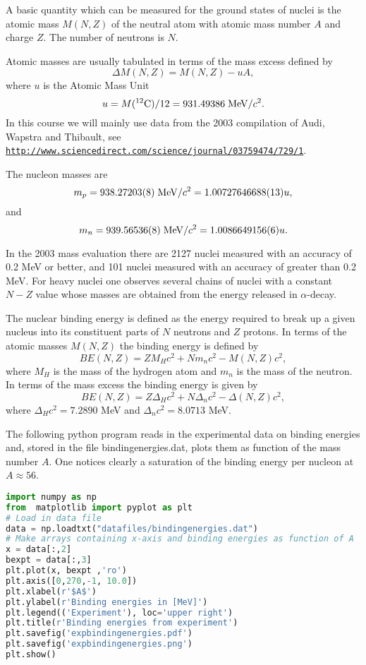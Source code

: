 \documentclass[graybox,sectrefs,envcountresetchap,open=right]{svmonodo}
\begin{document}
A basic quantity which can be measured for the ground states of nuclei is the atomic mass $M(N, Z)$ of the neutral atom with atomic mass number $A$ and charge $Z$. The number of neutrons is $N$.

Atomic masses are usually tabulated in terms of the mass excess defined by
\[
\Delta M(N, Z) =  M(N, Z) - uA,
\]
where $u$ is the Atomic Mass Unit 
\[
u = M(^{12}\mathrm{C})/12 = 931.49386 \hspace{0.1cm} \mathrm{MeV}/c^2.
\]
In this course we will mainly use 
data from the 2003 compilation of Audi, Wapstra and Thibault, see \href{{http://www.sciencedirect.com/science/journal/03759474/729/1}}{\nolinkurl{http://www.sciencedirect.com/science/journal/03759474/729/1}}.


The nucleon masses are
\[
m_p = 938.27203(8)\hspace{0.1cm} \mathrm{MeV}/c^2 = 1.00727646688(13)u,
\] 
and
\[
m_n = 939.56536(8)\hspace{0.1cm} \mathrm{MeV}/c^2 = 1.0086649156(6)u.
\]

In the 2003 mass evaluation there are 2127 nuclei measured with an accuracy of 0.2
MeV or better, and 101 nuclei measured with an accuracy of greater than 0.2 MeV. For
heavy nuclei one observes several chains of nuclei with a constant $N-Z$ value whose masses are obtained from the energy released in $\alpha$-decay.


The nuclear binding energy is defined as the energy required to break up a given nucleus
into its constituent parts of $N$ neutrons and $Z$ protons. In terms of the atomic masses $M(N, Z)$ the binding energy is defined by
\[
BE(N, Z) = ZM_H c^2 + Nm_n c^2 - M(N, Z)c^2 ,
\]
where $M_H$ is the mass of the hydrogen atom and $m_n$ is the mass of the neutron.
In terms of the mass excess the binding energy is given by
\[
BE(N, Z) = Z\Delta_H c^2 + N\Delta_n c^2 -\Delta(N, Z)c^2 ,
\]
where $\Delta_H c^2 = 7.2890$ MeV and $\Delta_n c^2 = 8.0713$ MeV.


The following python program reads in the experimental data on binding energies and, stored in the file bindingenergies.dat,  plots them as function of the mass number $A$. One notices clearly a saturation of the binding energy per nucleon at $A\approx 56$.
\begin{lstlisting}[language=Python,style=blue1bar]
import numpy as np
from  matplotlib import pyplot as plt
# Load in data file
data = np.loadtxt("datafiles/bindingenergies.dat")
# Make arrays containing x-axis and binding energies as function of A
x = data[:,2]
bexpt = data[:,3]
plt.plot(x, bexpt ,'ro')
plt.axis([0,270,-1, 10.0])
plt.xlabel(r'$A$')
plt.ylabel(r'Binding energies in [MeV]')
plt.legend(('Experiment'), loc='upper right')
plt.title(r'Binding energies from experiment')
plt.savefig('expbindingenergies.pdf')
plt.savefig('expbindingenergies.png')
plt.show()
\end{lstlisting}
\end{document}

